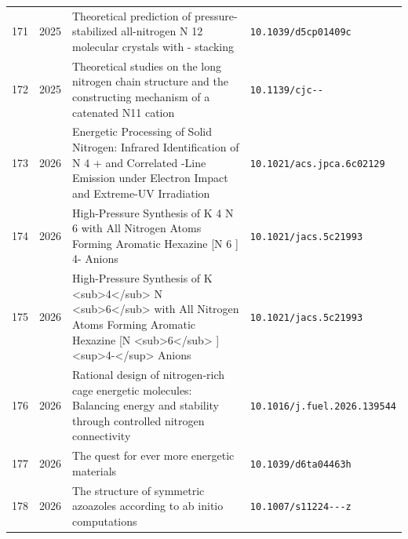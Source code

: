 {\begin{longtable}{@{}cp{1.0cm}p{8.4cm}p{4.2cm}@{}}
171 & 2025 & Theoretical prediction of pressure-stabilized all-nitrogen N 12 molecular crystals with - stacking & \texttt{10.1039/\allowbreak d5cp01409c} \\
172 & 2025 & Theoretical studies on the long nitrogen chain structure and the constructing mechanism of a catenated N11 cation & \texttt{10.1139/\allowbreak cjc-\allowbreak 2024-\allowbreak 0155} \\
173 & 2026 & Energetic Processing of Solid Nitrogen: Infrared Identification of N 4 + and Correlated -Line Emission under Electron Impact and Extreme-UV Irradiation & \texttt{10.1021/\allowbreak acs.jpca.6c02129} \\
174 & 2026 & High-Pressure Synthesis of K 4 N 6 with All Nitrogen Atoms Forming Aromatic Hexazine [N 6 ] 4- Anions & \texttt{10.1021/\allowbreak jacs.5c21993} \\
175 & 2026 & High-Pressure Synthesis of K <sub>4</sub> N <sub>6</sub> with All Nitrogen Atoms Forming Aromatic Hexazine [N <sub>6</sub> ] <sup>4-</sup> Anions & \texttt{10.1021/\allowbreak jacs.5c21993} \\
176 & 2026 & Rational design of nitrogen-rich cage energetic molecules: Balancing energy and stability through controlled nitrogen connectivity & \texttt{10.1016/\allowbreak j.fuel.2026.139544} \\
177 & 2026 & The quest for ever more energetic materials & \texttt{10.1039/\allowbreak d6ta04463h} \\
178 & 2026 & The structure of symmetric azoazoles according to ab initio computations & \texttt{10.1007/\allowbreak s11224-\allowbreak 025-\allowbreak 02688-\allowbreak z} \\
\end{longtable}
}